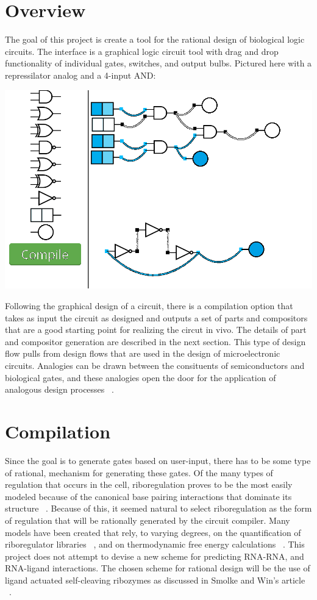 \documentclass[11pt]{article}
\begin{document}
\section*{Overview}
The goal of this project is create a tool for the rational design of biological 
logic circuits. The interface is a graphical logic circuit tool with drag and
drop functionality of individual gates, switches, and output bulbs. Pictured here
with a repressilator analog and a 4-input AND:

\includegraphics[scale=0.4]{repress_4and.png}

Following the graphical design of a circuit, there is a compilation option
that takes as input the circuit as designed and outputs a set of parts and
compositors that are a good starting point for realizing the circut in vivo.
The details of part and compositor generation are described in the next section.
This type of design flow pulls from design flows that are used in the design of
microelectronic circuits. Analogies can be drawn between the consituents
of semiconductors and biological gates, and these analogies open the door for 
the application of analogous design processes ~\cite{microelectronics}. 

\section*{Compilation}
Since the goal is to generate gates based on user-input, there has to 
be some type of rational, mechanism for generating these gates. 
Of the many types of regulation that occurs
in the cell, riboregulation proves to be the most easily modeled because of the
canonical base pairing interactions that dominate its structure ~\cite{howfolds}.
Because of this, it seemed natural to select riboregulation as the form of regulation
that will be rationally generated by the circuit compiler.
Many models have been created that rely, to varying degrees, on the
quantification of riboregulator libraries ~\cite{arkin_rational}, and on 
thermodynamic free energy calculations ~\cite{Keasling_Model-Driven}. This project does not attempt to devise
a new scheme for predicting RNA-RNA, and RNA-ligand interactions. The chosen scheme
for rational design will be the use of ligand actuated self-cleaving ribozymes as
discussed in Smolke and Win's article ~\cite{smolke_design}. 
\end{document}

